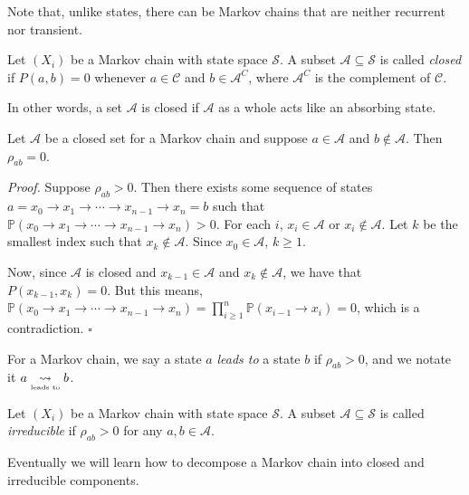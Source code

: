 \documentclass{problemset}
\newcommand{\1}{\mathbf{1}}
\renewcommand{\P}{\mathbb{P}}
\newcommand{\ldsto}{\underset{\text{\tiny leads to}}{\leadsto}}
\newenvironment{proof}{\emph{Proof.}}{\hfill$\square$}
\begin{document}
	Note that, unlike states, there can be Markov chains that are neither recurrent nor transient.

	\begin{definition}[Closed]
		Let $(X_i)$ be a Markov chain with state space $\mathcal S$.  A subset $\mathcal A\subseteq \mathcal S$ is
		called \emph{closed} if $P(a,b)=0$ whenever $a\in \mathcal C$ and $b\in \mathcal A^C$, where $\mathcal A^C$ is
		the complement of $\mathcal C$.
	\end{definition}

	In other words, a set $\mathcal A$ is closed if $\mathcal A$ as a whole acts like
	an absorbing state.

	\begin{lemma}
		Let $\mathcal A$ be a closed set for a Markov chain and suppose $a\in \mathcal A$ and $b\notin \mathcal A$.
		Then $\rho_{ab} = 0$.
	\end{lemma}
	\begin{proof}
		Suppose $\rho_{ab}>0$.  Then there exists some sequence of states $a=x_0\to x_1\to\cdots\to x_{n-1}\to x_{n}=b$
		such that $\P(x_0\to x_1\to\cdots\to x_{n-1}\to x_{n})>0$.  For each $i$, $x_i\in \mathcal A$ or $x_i\notin\mathcal A$.
		Let $k$ be the smallest index such that $x_k\notin \mathcal A$.  Since $x_0\in\mathcal A$, $k\geq 1$.

		Now, since $\mathcal A$ is closed and $x_{k-1}\in \mathcal A$ and $x_k\notin\mathcal A$, we have that $P(x_{k-1},x_k)=0$.
		But this means, $\P(x_0\to x_1\to\cdots\to x_{n-1}\to x_{n}) = \prod_{i\geq 1}^n \P(x_{i-1}\to x_i) = 0$, which
		is a contradiction.
	\end{proof}

	\begin{definition}[Leads To]
		For a Markov chain, we say a state $a$ \emph{leads to} a state $b$ if $\rho_{ab}>0$, and we
		notate it $a\ldsto b$.
	\end{definition}
	\begin{definition}[Irreducible]
		Let $(X_i)$ be a Markov chain with state space $\mathcal S$.  A subset $\mathcal A\subseteq\mathcal S$
		is called \emph{irreducible} if $\rho_{ab}>0$ for any $a,b\in\mathcal A$.
	\end{definition}

	Eventually we will learn how to decompose a Markov chain into closed and irreducible components.
\end{document}
